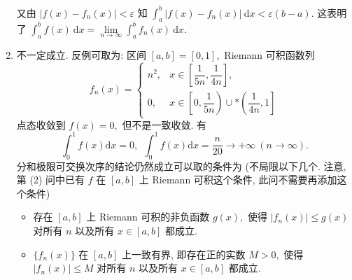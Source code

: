 \begin{solution}
\begin{enumerate}
又由 $\lvert f(x) - f_n(x) \rvert < \varepsilon$ 知 $\int_a^b \lvert f(x) - f_n(x) \rvert ~ \mathrm{d} x < \varepsilon (b - a).$ 这表明了 $\int_a^b f(x) ~ \mathrm{d} x = \lim\limits_{n\to\infty} \int_a^b f_n(x) ~ \mathrm{d} x.$
\item 不一定成立. 反例可取为: 区间 $[a, b] = [0, 1],$ Riemann 可积函数列
\[f_n(x) = \begin{cases}
n^2, & x \in \left[ \dfrac{1}{5n}, \dfrac{1}{4n} \right], \\
0, & x \in \left[0, \dfrac{1}{5n} \right) \cup* \left(\dfrac{1}{4n}, 1 \right]
\end{cases}\]
点态收敛到 $f(x) = 0,$ 但不是一致收敛. 有
\[\int_0^1 f(x) \mathrm{d} x = 0, ~~ \int_0^1 f(x) \mathrm{d} x = \dfrac{n}{20} \to +\infty ~ (n \to \infty).\]
分和极限可交换次序的结论仍然成立可以取的条件为 (不局限以下几个. 注意, 第 (2) 问中已有 $f$ 在 $[a, b]$ 上 Riemann 可积这个条件, 此问不需要再添加这个条件)
\begin{itemize}
\item 存在 $[a, b]$ 上 Riemann 可积的非负函数 $g(x),$ 使得 $\lvert f_n(x) \rvert \leqslant g(x)$ 对所有 $n$ 以及所有 $x \in [a, b]$ 都成立.
\item $\{f_n(x)\}$ 在 $[a, b]$ 上一致有界, 即存在正的实数 $M > 0,$ 使得 $\lvert f_n(x) \rvert \leqslant M$ 对所有 $n$ 以及所有 $x \in [a, b]$ 都成立.
\end{itemize}
\end{enumerate}
\end{solution}


